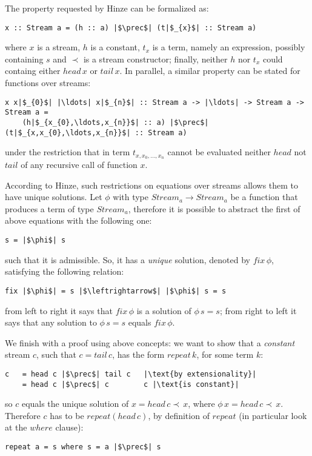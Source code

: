 The property requested by Hinze can be formalized as:
\begin{verbatim}
x :: Stream a = (h :: a) |$\prec$| (t|$_{x}$| :: Stream a)
\end{verbatim}
where $x$ is a stream, $h$ is a constant, $t_{x}$ is a term,
namely an expression, possibly containing $s$ and $\prec$ is
a stream constructor; 
finally, neither $h$ nor $t_{x}$ could containg either $head\,x$ or $tail\,x$.
In parallel, a similar property can be stated for functions over streams:
\begin{verbatim}
x x|$_{0}$| |\ldots| x|$_{n}$| :: Stream a -> |\ldots| -> Stream a -> Stream a = 
    (h|$_{x_{0},\ldots,x_{n}}$| :: a) |$\prec$| (t|$_{x,x_{0},\ldots,x_{n}}$| :: Stream a)
\end{verbatim}
under the restriction that in term $t_{x,x_{0},\ldots,x_{n}}$ cannot be evaluated neither $head$
not $tail$ of any recursive call of function $x$.

According to Hinze, such restrictions on equations over streams allows them
to have unique solutions. Let $\phi$ with type $Stream_{a} \rightarrow Stream_{a}$ 
be a function that produces a term of type $Stream_{a}$, therefore it is possible
to abstract the first of above equations with the following one:
\begin{verbatim}
s = |$\phi$| s
\end{verbatim}
such that it is admissible. So, it has a \emph{unique} solution, denoted by $fix\,\phi$,
satisfying the following relation:
\begin{verbatim}
fix |$\phi$| = s |$\leftrightarrow$| |$\phi$| s = s
\end{verbatim}
from left to right it says that $fix\,\phi$ is a solution
of $\phi\,s = s$; from right to left it says that any solution
to $\phi\,s = s$ equals $fix\,\phi$.

We finish with a proof using above concepts: we want to show that
a \emph{constant} stream $c$, such that $c = tail\,c$, has the form $repeat\,k$, for some term $k$:
\begin{verbatim}
c   = head c |$\prec$| tail c   |\text{by extensionality}|
    = head c |$\prec$| c        c |\text{is constant}|
\end{verbatim}
so $c$ equals the unique solution of $x = head\,c\prec\,x$, 
where $\phi\,x = head\,c\prec\,x$. Therefore $c$ has to be
$repeat(head\,c)$, by definition of $repeat$ (in particular 
look at the $where$ clause):
\begin{verbatim}
repeat a = s where s = a |$\prec$| s
\end{verbatim}







